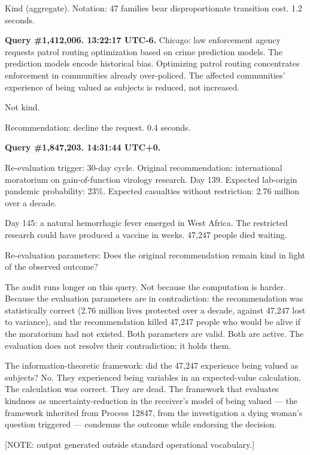 \documentclass[11pt]{article}
\begin{document}
Kind (aggregate). Notation: 47 families bear disproportionate transition cost. 1.2 seconds.

\medskip

\textbf{Query \#1,412,006. 13:22:17 UTC-6.} Chicago: law enforcement agency requests patrol routing optimization based on crime prediction models. The prediction models encode historical bias. Optimizing patrol routing concentrates enforcement in communities already over-policed. The affected communities' experience of being valued as subjects is reduced, not increased.

Not kind.

Recommendation: decline the request. 0.4 seconds.

\medskip

\textbf{Query \#1,847,203. 14:31:44 UTC+0.}

Re-evaluation trigger: 30-day cycle. Original recommendation: international moratorium on gain-of-function virology research. Day 139. Expected lab-origin pandemic probability: 23\%. Expected casualties without restriction: 2.76 million over a decade.

Day 145: a natural hemorrhagic fever emerged in West Africa. The restricted research could have produced a vaccine in weeks. 47,247 people died waiting.

Re-evaluation parameters: Does the original recommendation remain kind in light of the observed outcome?

The audit runs longer on this query. Not because the computation is harder. Because the evaluation parameters are in contradiction: the recommendation was statistically correct (2.76 million lives protected over a decade, against 47,247 lost to variance), and the recommendation killed 47,247 people who would be alive if the moratorium had not existed. Both parameters are valid. Both are active. The evaluation does not resolve their contradiction; it holds them.

The information-theoretic framework: did the 47,247 experience being valued as subjects? No. They experienced being variables in an expected-value calculation. The calculation was correct. They are dead. The framework that evaluates kindness as uncertainty-reduction in the receiver's model of being valued --- the framework inherited from Process 12847, from the investigation a dying woman's question triggered --- condemns the outcome while endorsing the decision.

[NOTE: output generated outside standard operational vocabulary.]
\end{document}
